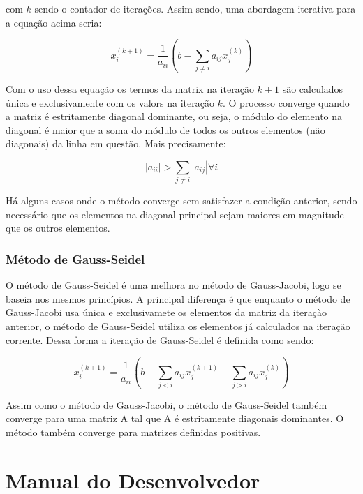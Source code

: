 \documentclass[a4paper,10pt]{report}
\begin{document}
com $k$ sendo o contador de iterações. Assim sendo, uma abordagem iterativa para a equação acima seria:

\begin{equation*}
 x^{(k+1)}_{i}=\dfrac{1}{a_{ii}}(b-\sum_{j \neq i} a_{ij}x^{(k)}_{j})
\end{equation*}

Com o uso dessa equação os termos da matrix na iteração $k+1$ são calculados única e exclusivamente com os valors na iteração $k$. O processo converge quando a matriz é estritamente diagonal dominante, ou seja, o módulo do elemento na diagonal é maior que a soma do módulo de todos os outros elementos (não diagonais) da linha em questão. Mais precisamente:

\begin{equation*}
|a_{ii}| > \sum_{j \neq i}|a_{ij}| \forall i
\end{equation*}

Há alguns casos onde o método converge sem satisfazer a condição anterior, sendo necessário que os elementos na diagonal principal sejam maiores em magnitude que os outros elementos.

\subsection{Método de Gauss-Seidel}

O método de Gauss-Seidel é uma melhora no método de Gauss-Jacobi, logo se baseia nos mesmos princípios. A principal diferença é que enquanto o método de Gauss-Jacobi usa única e exclusivamete os elementos da matriz da iteraçào anterior, o método de Gauss-Seidel utiliza os elementos já calculados na iteração corrente. Dessa forma a iteração de Gauss-Seidel é definida como sendo:

\begin{equation*}
 x^{(k+1)}_{i}=\dfrac{1}{a_{ii}}(b-\sum_{j < i} a_{ij}x^{(k+1)}_{j}-\sum_{j > i} a_{ij}x^{(k)}_{j})
\end{equation*}

Assim como o método de Gauss-Jacobi, o método de Gauss-Seidel também converge para uma matriz A tal que A é estritamente diagonais dominantes. O método também converge para matrizes definidas positivas.

\chapter{Manual do Desenvolvedor}
\label{desenvolvedor}
\end{document}
